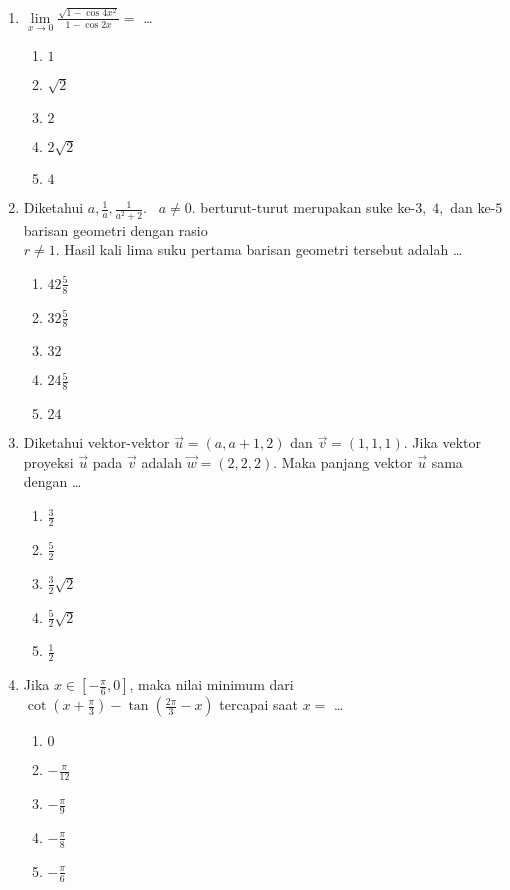 \documentclass[A4,12PT, english, twocolumn]{journal}
\begin{document}
\begin{enumerate}
\item $\lim\limits_{x \longrightarrow 0} {\frac{\sqrt{1-\cos 4x^2}}{1-\cos 2x}}=$ \dots
    \begin{enumerate}
        \item $1$
        \item $\sqrt{2}$
        \item $2$
        \item $2\sqrt{2}$
        \item $4$
    \end{enumerate}

\item Diketahui $a,\frac{1}{a},\frac{1}{a^2+2}. \; \; \; a\neq 0$. berturut-turut merupakan suke ke-$3, \; 4,$ dan ke-$5$ barisan geometri dengan rasio \\ $r \neq 1$. Hasil kali lima suku pertama barisan geometri tersebut adalah \dots
    \begin{enumerate}
        \item $42 \frac{5}{8}$
        \item $32 \frac{5}{8}$
        \item $32$
        \item $24 \frac{5}{8}$
        \item $24$
    \end{enumerate}
    
\item Diketahui vektor-vektor $\Vec{u} = \left(a,a+1,2 \right)$ dan $\Vec{v} = \left(1,1,1 \right)$. Jika vektor proyeksi $\Vec{u}$ pada $\Vec{v}$ adalah $\Vec{w} = \left(2,2,2 \right)$. Maka panjang vektor $\Vec{u}$ sama dengan \dots
    \begin{enumerate}
        \item $\frac{3}{2}$
        \item $\frac{5}{2}$
        \item $\frac{3}{2} \sqrt{2}$
        \item $\frac{5}{2} \sqrt{2}$
        \item $\frac{1}{2}$
    \end{enumerate}
    
\item Jika $x \in \left[-\frac {\pi}{6},0 \right]$, maka nilai minimum dari \\ $\cot \left( {x + \frac{\pi}{3}} \right) - \tan \left( {\frac{2\pi}{3}-x} \right)$ tercapai saat $x=$ \dots
    \begin{enumerate}
        \item $0$
        \item $-\frac{\pi}{12}$
        \item $-\frac{\pi}{9}$
        \item $-\frac{\pi}{8}$
        \item $-\frac{\pi}{6}$
    \end{enumerate}
    

\end{enumerate}
\end{document}

